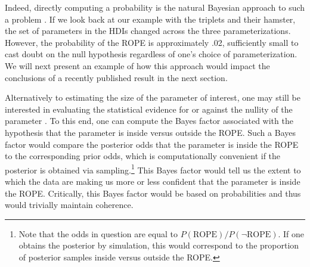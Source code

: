 \documentclass[9pt,twocolumn,twoside]{cidlab-draft}\templatetype{cidlab-invited}
\begin{document}
Indeed, directly computing a probability is the natural Bayesian approach to such a problem \cite{wellek2002testing}. If we look back at our example with the triplets and their hamster, the set of parameters in the HDIs changed across the three parameterizations. However, the probability of the ROPE is approximately .02, sufficiently small to cast doubt on the null hypothesis regardless of one's choice of parameterization.  We will next present an example of how this approach would impact the conclusions of a recently published result in the next section.



Alternatively to estimating the size of the parameter of interest, one may still be interested in evaluating the statistical evidence for or against the nullity of the parameter%
. To this end, one can compute the Bayes factor associated with the hypothesis that the parameter is inside versus outside the ROPE. Such a Bayes factor would compare the posterior odds that the parameter is inside the ROPE to the corresponding prior odds, which is computationally convenient if the posterior is obtained via sampling.\footnote{Note that the odds in question are equal to $P(\text{ROPE})/P(\lnot \text{ROPE})$. If one obtains the posterior by simulation, this would correspond to the proportion of posterior samples inside versus outside the ROPE.} This Bayes factor would tell us the extent to which the data are making us more or less confident that the parameter is inside the ROPE. Critically, this Bayes factor would be based on probabilities and thus would trivially maintain coherence.
\end{document}
